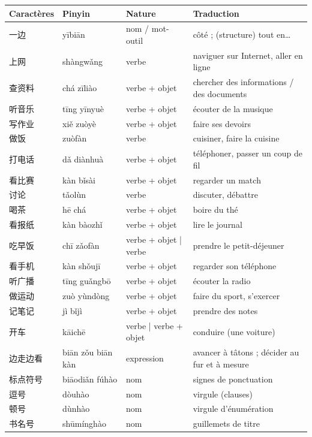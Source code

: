 \documentclass[11pt]{article}
\newcommand{\zh}[1]{\ifmmode\text{#1}\else{#1}\fi}
\begin{document}
\begin{center}
\begin{tabularx}{\linewidth}{|X|X|X|X|}
\hline
\rowcolor{popblueL} \textbf{Caractères} & \textbf{Pinyin} & \textbf{Nature} & \textbf{Traduction} \\
\hline
一边 & yībiān & nom / mot-outil & côté ; (structure) tout en… \\
\hline
上网 & shàngwǎng & verbe & naviguer sur Internet, aller en ligne \\
\hline
查资料 & chá zīliào & verbe + objet & chercher des informations / des documents \\
\hline
听音乐 & tīng yīnyuè & verbe + objet & écouter de la musique \\
\hline
写作业 & xiě zuòyè & verbe + objet & faire ses devoirs \\
\hline
做饭 & zuòfàn & verbe & cuisiner, faire la cuisine \\
\hline
打电话 & dǎ diànhuà & verbe + objet & téléphoner, passer un coup de fil \\
\hline
看比赛 & kàn bǐsài & verbe + objet & regarder un match \\
\hline
讨论 & tǎolùn & verbe & discuter, débattre \\
\hline
喝茶 & hē chá & verbe + objet & boire du thé \\
\hline
看报纸 & kàn bàozhǐ & verbe + objet & lire le journal \\
\hline
吃早饭 & chī zǎofàn & verbe + objet | verbe & prendre le petit-déjeuner \\
\hline
看手机 & kàn shǒujī & verbe + objet & regarder son téléphone \\
\hline
听广播 & tīng guǎngbō & verbe + objet & écouter la radio \\
\hline
做运动 & zuò yùndòng & verbe + objet & faire du sport, s'exercer \\
\hline
记笔记 & jì bǐjì & verbe + objet & prendre des notes \\
\hline
开车 & kāichē & verbe | verbe + objet & conduire (une voiture) \\
\hline
边走边看 & biān zǒu biān kàn & expression & avancer à tâtons ; décider au fur et à mesure \\
\hline
标点符号 & biāodiǎn fúhào & nom & signes de ponctuation \\
\hline
逗号 & dòuhào & nom & virgule (clauses) \zh{，} \\
\hline
顿号 & dùnhào & nom & virgule d'énumération \zh{、} \\
\hline
书名号 & shūmínghào & nom & guillemets de titre \zh{《 》} \\
\hline
\end{tabularx}
\end{center}
\end{document}
